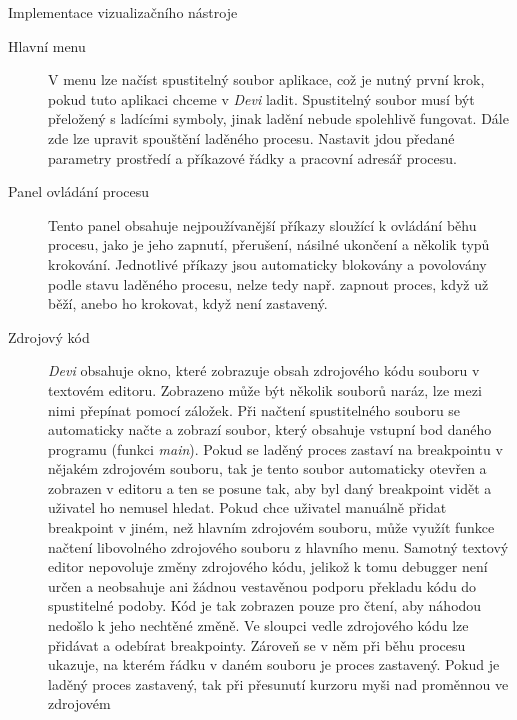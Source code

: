\documentclass[bc,male,python,dept460]{diploma}						%
\begin{document}
\begin{section}{Implementace vizualizačního nástroje}
	
	
	\begin{description}
		\item[Hlavní menu] V menu lze načíst spustitelný soubor aplikace, což je nutný první krok, pokud tuto aplikaci chceme v \textit{Devi} ladit.
			Spustitelný soubor musí být přeložený s ladícími symboly, jinak ladění nebude spolehlivě fungovat. Dále zde lze upravit spouštění laděného procesu.
			Nastavit jdou předané parametry prostředí a příkazové řádky a pracovní adresář procesu.
		\item[Panel ovládání procesu] Tento panel obsahuje nejpoužívanější příkazy sloužící k ovládání běhu procesu, jako je jeho zapnutí, přerušení, násilné
			ukončení a několik typů krokování. Jednotlivé příkazy jsou automaticky blokovány a povolovány podle stavu laděného procesu, nelze tedy např. zapnout
			proces, když už běží, anebo ho krokovat, když není zastavený.
		\item[Zdrojový kód] \textit{Devi} obsahuje okno, které zobrazuje obsah zdrojového kódu souboru v textovém editoru. Zobrazeno může být několik souborů naráz,
			lze mezi nimi přepínat pomocí záložek. Při načtení spustitelného souboru se automaticky načte a zobrazí soubor, který obsahuje vstupní bod daného programu
			(funkci \textit{main}). Pokud se laděný proces zastaví na breakpointu v nějakém zdrojovém souboru, tak je tento soubor automaticky otevřen a zobrazen
			v editoru a ten se posune tak, aby byl daný breakpoint vidět a uživatel ho nemusel hledat. Pokud chce uživatel manuálně přidat breakpoint v jiném, než
			hlavním zdrojovém souboru, může využít funkce načtení libovolného zdrojového souboru z hlavního menu. Samotný textový editor nepovoluje změny zdrojového
			kódu, jelikož k tomu debugger není určen a neobsahuje ani žádnou vestavěnou podporu překladu kódu do spustitelné podoby. Kód je tak zobrazen pouze pro
			čtení, aby náhodou nedošlo k jeho nechtěné změně. Ve sloupci vedle zdrojového kódu lze přidávat a odebírat breakpointy. Zároveň se v něm při běhu procesu
			ukazuje, na kterém řádku v daném souboru je proces zastavený. Pokud je laděný proces zastavený, tak při přesunutí kurzoru myši nad proměnnou ve zdrojovém

\end{description}
\end{section}
\end{document}
